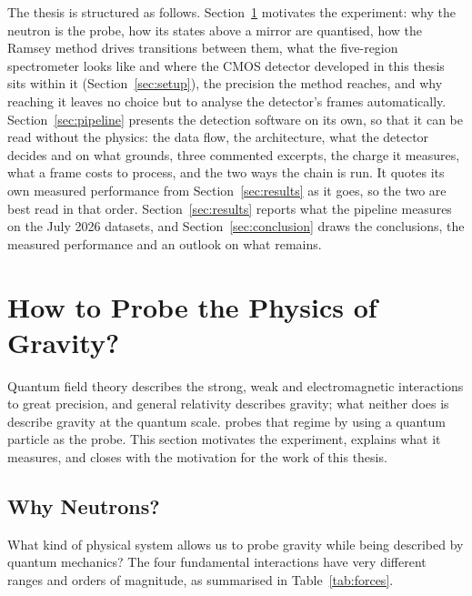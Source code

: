\documentclass[a4paper,headsepline,oneside,11pt]{scrartcl}
\begin{document}
The thesis is structured as follows.
Section~\ref{sec:probe} motivates the experiment: why the neutron is the probe,
how its states above a mirror are quantised, how the Ramsey method drives
transitions between them, what the five-region spectrometer looks like and where
the CMOS detector developed in this thesis sits within it
(Section~\ref{sec:setup}), the precision the method reaches, and why reaching it
leaves no choice but to analyse the detector's frames automatically.
Section~\ref{sec:pipeline} presents the detection software on its own, so that
it can be read without the physics: the data flow, the architecture, what the
detector decides and on what grounds, three commented excerpts, the charge it
measures, what a frame costs to process, and the two ways the chain is run. It
quotes its own measured performance from Section~\ref{sec:results} as it goes,
so the two are best read in that order.
Section~\ref{sec:results} reports what the pipeline measures on the July 2026
datasets, and Section~\ref{sec:conclusion} draws the conclusions, the measured
performance and an outlook on what remains.

\FloatBarrier
\newpage
\section{How to Probe the Physics of Gravity?}
\label{sec:probe}
\graphicspath{{images_from_presentation/}{./}}


Quantum field theory describes the strong, weak and electromagnetic interactions
to great precision, and general relativity describes gravity; what neither does
is describe gravity at the quantum scale. \qbounce{} probes that regime by using a
quantum particle as the probe. This section motivates the experiment, explains
what it measures, and closes with the motivation for the work of this thesis.
\subsection{Why Neutrons?}
\label{sec:probe_neutrons}
What kind of physical system allows us to probe gravity while being described by quantum mechanics?
The four fundamental interactions have very different ranges and orders of magnitude, as summarised in Table~\ref{tab:forces}.
\end{document}
